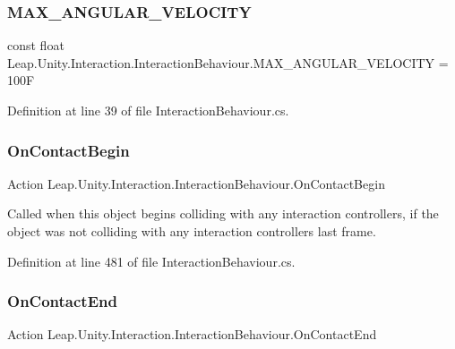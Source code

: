 \subsubsection{\texorpdfstring{MAX\_ANGULAR\_VELOCITY}{MAX\_ANGULAR\_VELOCITY}}
{\footnotesize\ttfamily const float Leap.\+Unity.\+Interaction.\+Interaction\+Behaviour.\+M\+A\+X\+\_\+\+A\+N\+G\+U\+L\+A\+R\+\_\+\+V\+E\+L\+O\+C\+I\+TY = 100F}



Definition at line 39 of file Interaction\+Behaviour.\+cs.

\mbox{\label{class_leap_1_1_unity_1_1_interaction_1_1_interaction_behaviour_ab577334d9537036c90b20660e434b2d0}} 
\subsubsection{\texorpdfstring{OnContactBegin}{OnContactBegin}}
{\footnotesize\ttfamily Action Leap.\+Unity.\+Interaction.\+Interaction\+Behaviour.\+On\+Contact\+Begin}



Called when this object begins colliding with any interaction controllers, if the object was not colliding with any interaction controllers last frame. 



Definition at line 481 of file Interaction\+Behaviour.\+cs.

\mbox{\label{class_leap_1_1_unity_1_1_interaction_1_1_interaction_behaviour_a837845efd5d6e112b526078a4ae5f1fc}} 
\subsubsection{\texorpdfstring{OnContactEnd}{OnContactEnd}}
{\footnotesize\ttfamily Action Leap.\+Unity.\+Interaction.\+Interaction\+Behaviour.\+On\+Contact\+End}



